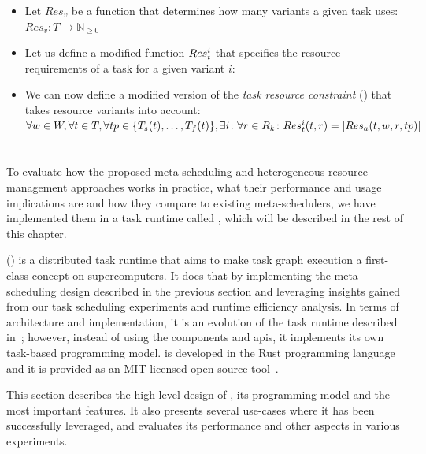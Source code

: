 \begin{itemize}[itemsep=0pt]
	\item Let $Res_v$ be a function that determines how many variants a given task uses: \\
	$Res_v\colon T \rightarrow \mathbb{N}_{\geq{}0}$
	\item Let us define a modified function $Res_t^{i}$ that specifies the resource
	requirements of a task for a given variant $i$: \\
	\item We can now define a modified version of the \emph{task resource constraint}
	() that takes resource variants into account: \\
	$\forall w\in{}W, \forall t\in{}T, \forall tp\in\{T_s(t),\ldots,T_f(t)\}, \exists i\colon \forall r\in{}R_k\colon Res_t^{i}(t, r) = |Res_a(t, w, r, tp)|$
\end{itemize}


\section{\hyperqueue{}}
To evaluate how the proposed meta-scheduling and heterogeneous resource management approaches works
in practice, what their performance and usage implications are and how they compare to existing
meta-schedulers, we have implemented them in a task runtime called \hyperqueue{}, which will be
described in the rest of this chapter.

\hyperqueue{} (\hq{}) is a distributed task runtime that aims to make task graph execution a
first-class concept on supercomputers. It does that by implementing the meta-scheduling design
described in the previous section and leveraging insights gained from our task scheduling
experiments and \dask{} runtime efficiency analysis. In terms of architecture and
implementation, it is an evolution of the \rsds{} task runtime described
in~; however, instead of using the \dask{} components and
\glspl{api}, it implements its own task-based programming model.
\hyperqueue{} is developed in the Rust programming language~\cite{rust} and
it is provided as an \mbox{MIT-licensed} open-source tool~\cite{hq_github}.

This section describes the high-level design of \hyperqueue{}, its programming model and
the most important features. It also presents several use-cases where it has been successfully
leveraged, and evaluates its performance and other aspects in various experiments.

